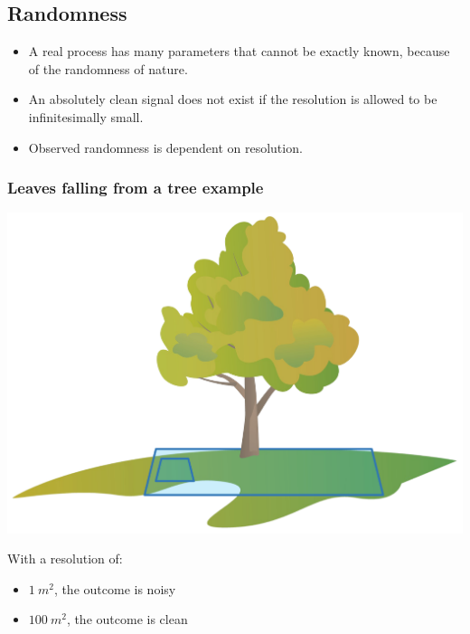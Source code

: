 \documentclass[11pt]{article}
\begin{document}
\subsection{Randomness}
\label{sec:org13f856d}
\begin{itemize}
\item A real process has many parameters that cannot be exactly known, because of the randomness of nature.
\item An absolutely clean signal does not exist if the resolution is allowed to be infinitesimally small.
\item Observed randomness is dependent on resolution.
\end{itemize}

\subsubsection{Leaves falling from a tree example}
\label{sec:orgc279aec}
\begin{center}
\includegraphics[width=.9\linewidth]{./images/leaves-falling-from-a-tree-signal.png}
\end{center}

With a resolution of:
\begin{itemize}
\item \(\qty{1}{m^2}\), the outcome is noisy
\item \(\qty{100}{m^2}\), the outcome is clean
\end{itemize}

 \newpage
\end{document}

